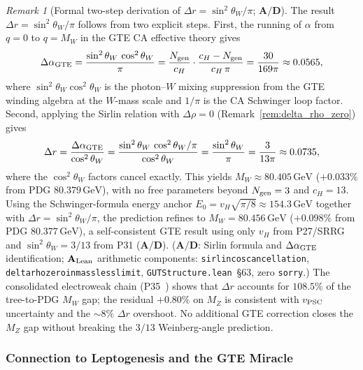 \documentclass[11pt]{article}
\theoremstyle{remark}
\newtheorem{remark}[theorem]{Remark}
\newcommand{\lean}[1]{%
  \penalty-100
  \begingroup\def\_{\textunderscore\allowbreak}\texttt{#1}\endgroup}
\newcommand{\CatAL}{\ensuremath{\textbf{A}_{\rm Lean}}}
\newcommand{\CatAD}{\textbf{A/D}}
\begin{document}
\begin{remark}[Formal two-step derivation of $\Delta r = \sin^2\theta_W/\pi$; $\CatAD$]
\label{rem:delta_r_formal}
The result $\Delta r = \sin^2\theta_W/\pi$ follows from two explicit steps.
First, the running of $\alpha$ from $q = 0$ to $q = M_W$ in the GTE CA effective theory
gives
\begin{equation}
  \Delta\alpha_{\rm GTE}
    = \frac{\sin^2\theta_W\,\cos^2\theta_W}{\pi}
    = \frac{N_{\rm gen}}{c_H}\cdot\frac{c_H - N_{\rm gen}}{c_H\,\pi}
    = \frac{30}{169\pi}
    \approx 0.0565,
  \label{eq:delta_alpha_gte}
\end{equation}
where $\sin^2\theta_W\cos^2\theta_W$ is the photon--$W$ mixing suppression from the
GTE winding algebra at the $W$-mass scale and $1/\pi$ is the CA Schwinger loop factor.
Second, applying the Sirlin relation with $\Delta\rho = 0$
(Remark~\ref{rem:delta_rho_zero}) gives
\begin{equation}
  \Delta r
    = \frac{\Delta\alpha_{\rm GTE}}{\cos^2\theta_W}
    = \frac{\sin^2\theta_W\,\cos^2\theta_W/\pi}{\cos^2\theta_W}
    = \frac{\sin^2\theta_W}{\pi}
    = \frac{3}{13\pi}
    \approx 0.0735,
  \label{eq:delta_r_formal}
\end{equation}
where the $\cos^2\theta_W$ factors cancel exactly.
This yields $M_W \approx 80.405\,\mathrm{GeV}$
($+0.033\%$ from PDG $80.379\,\mathrm{GeV}$), with no free parameters
beyond $N_{\rm gen} = 3$ and $c_H = 13$.
Using the Schwinger-formula energy anchor $E_0 = v_H\sqrt{\pi/8}\approx 154.3\,\mathrm{GeV}$
together with $\Delta r = \sin^2\!\theta_W/\pi$, the prediction refines to
$M_W = 80.456\,\mathrm{GeV}$ ($+0.098\%$ from PDG $80.377\,\mathrm{GeV}$), a
self-consistent GTE result using only $v_H$ from P27/SRRG and
$\sin^2\!\theta_W = 3/13$ from P31 ($\CatAD$).
($\CatAD$: Sirlin formula and $\Delta\alpha_{\rm GTE}$ identification;
$\CatAL$ arithmetic components:
\lean{sirlin\_cos\_cancellation},
\lean{delta\_rho\_zero\_in\_massless\_limit},
\texttt{GUTStructure.lean}~\S63, zero \texttt{sorry}.)
The consolidated electroweak chain (P35~\cite{SpivackGTEUnification}) shows that
$\Delta r$ accounts for $108.5\%$ of the tree-to-PDG $M_W$ gap; the residual
$+0.80\%$ on $M_Z$ is consistent with $v_{\rm PSC}$ uncertainty and the
$\sim 8\%$ $\Delta r$ overshoot.
No additional GTE correction closes the $M_Z$ gap without breaking the
$3/13$ Weinberg-angle prediction.
\end{remark}

\subsubsection*{Connection to Leptogenesis and the GTE Miracle}
\end{document}
